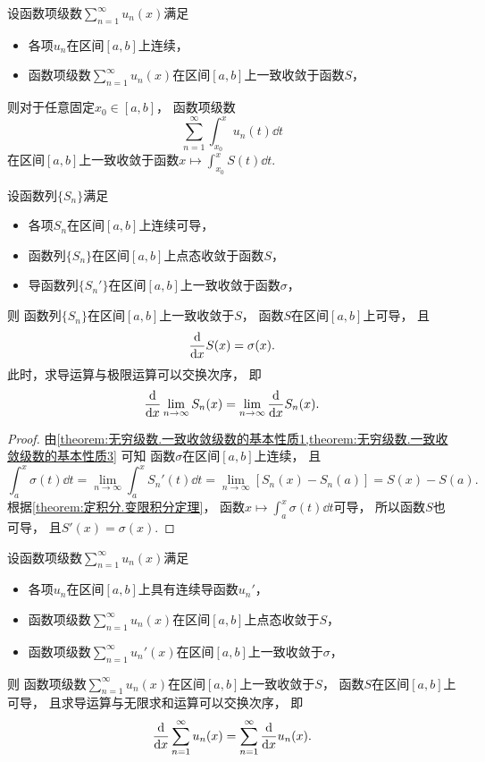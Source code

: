 \begin{proposition}
设函数项级数\(\sum_{n=1}^\infty u_n(x)\)满足\begin{itemize}
	\item 各项\(u_n\)在区间\([a,b]\)上连续，
	\item 函数项级数\(\sum_{n=1}^\infty u_n(x)\)在区间\([a,b]\)上一致收敛于函数\(S\)，
\end{itemize}
则对于任意固定\(x_0\in[a,b]\)，
函数项级数\[
	\sum_{n=1}^\infty \int_{x_0}^x u_n(t) \dd{t}
\]在区间\([a,b]\)上一致收敛于函数\(x \mapsto \int_{x_0}^x S(t) \dd{t}\).
\end{proposition}

\begin{theorem}\label{theorem:无穷级数.一致收敛级数的基本性质4}
设函数列\(\{S_n\}\)满足\begin{itemize}
	\item 各项\(S_n\)在区间\([a,b]\)上连续可导，
	\item 函数列\(\{S_n\}\)在区间\([a,b]\)上点态收敛于函数\(S\)，
	\item 导函数列\(\{S_n'\}\)在区间\([a,b]\)上一致收敛于函数\(\sigma\)，
\end{itemize}
则
函数列\(\{S_n\}\)在区间\([a,b]\)上一致收敛于\(S\)，
函数\(S\)在区间\([a,b]\)上可导，
且\[
	\dv{x} S(x) = \sigma(x).
\]
此时，求导运算与极限运算可以交换次序，
即\[
	\dv{x} \lim_{n\to\infty} S_n(x)
	= \lim_{n\to\infty} \dv{x} S_n(x).
\]
\begin{proof}
由\cref{theorem:无穷级数.一致收敛级数的基本性质1,theorem:无穷级数.一致收敛级数的基本性质3} 可知
函数\(\sigma\)在区间\([a,b]\)上连续，
且\[
	\int_a^x \sigma(t) \dd{t}
	= \lim_{n\to\infty} \int_a^x S_n'(t) \dd{t}
	= \lim_{n\to\infty} [S_n(x) - S_n(a)]
	= S(x) - S(a).
\]
根据\cref{theorem:定积分.变限积分定理}，
函数\(x \mapsto \int_a^x \sigma(t) \dd{t}\)可导，
所以函数\(S\)也可导，
且\(S'(x) = \sigma(x)\).
\end{proof}
\end{theorem}
\begin{theorem}
设函数项级数\(\sum_{n=1}^\infty u_n(x)\)满足\begin{itemize}
	\item 各项\(u_n\)在区间\([a,b]\)上具有连续导函数\(u_n'\)，
	\item 函数项级数\(\sum_{n=1}^\infty u_n(x)\)在区间\([a,b]\)上点态收敛于\(S\)，
	\item 函数项级数\(\sum_{n=1}^\infty u_n'(x)\)在区间\([a,b]\)上一致收敛于\(\sigma\)，
\end{itemize}
则
函数项级数\(\sum_{n=1}^\infty u_n(x)\)在区间\([a,b]\)上一致收敛于\(S\)，
函数\(S\)在区间\([a,b]\)上可导，
且求导运算与无限求和运算可以交换次序，
即\[
	\dv{x} \sum_{n=1}^\infty u_n(x)
	= \sum_{n=1}^\infty \dv{x} u_n(x).
\]
\end{theorem}
